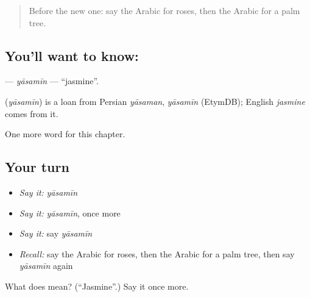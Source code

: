 \label{lesson:AR-C247-yasamin}



\begin{quote}
Before the new one: say the Arabic for roses, then the Arabic for a palm tree.
\end{quote}

\subsection*{You'll want to know: }
\textbf{} — \emph{yāsamīn} — \textquotedblleft{}jasmine\textquotedblright{}.

\begin{cousinweb}
\textbf{} (\emph{yāsamīn}) is a loan from Persian \emph{yāsaman}, \emph{yāsamīn} (EtymDB); English \emph{jasmine} comes from it.
\end{cousinweb}

\begin{grammarlens}[title={What you've built}]
One more word for this chapter.
\end{grammarlens}

\subsection*{Your turn}
\begin{itemize}
\raggedright
  \item \emph{Say it:} \emph{yāsamīn}
  \item \emph{Say it:} \emph{yāsamīn}, once more
  \item \emph{Say it:} say \emph{yāsamīn}
  \item \emph{Recall:} say the Arabic for roses, then the Arabic for a palm tree, then say \emph{yāsamīn} again
\end{itemize}

\begin{tcolorbox}[breakable,colback=teal!4,colframe=teal!35!black,title={Before you move on}]
What does  mean? (\textquotedblleft{}Jasmine\textquotedblright{}.) Say it once more.
\end{tcolorbox}
